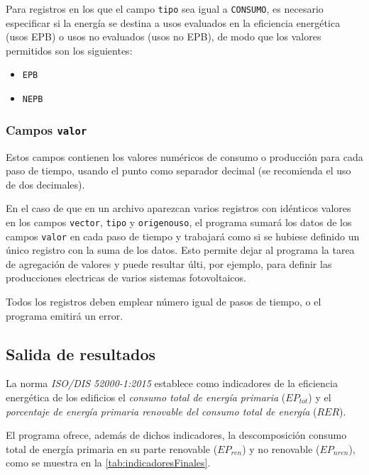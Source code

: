 \documentclass[10pt,notitlepage,oneside,a4paper]{article}
\begin{document}
Para registros en los que el campo \texttt{tipo} sea igual a \texttt{CONSUMO}, es necesario especificar si la energía se destina a usos evaluados en la eficiencia energética (usos EPB) o usos no evaluados (usos no EPB), de modo que los valores permitidos son los siguientes:

\begin{itemize}
\item \texttt{EPB}
\item \texttt{NEPB}
\end{itemize}

\subsubsection{Campos \texttt{valor}}

Estos campos contienen los valores numéricos de consumo o producción para cada paso de tiempo, usando el punto como separador decimal (se recomienda el uso de dos decimales).

En el caso de que en un archivo aparezcan varios registros con idénticos valores en los campos \texttt{vector}, \texttt{tipo} y \texttt{origenouso}, el programa sumará los datos de los campos \texttt{valor} en cada paso de tiempo y trabajará como si se hubiese definido un único registro con la suma de los datos. Esto permite dejar al programa la tarea de agregación de valores y puede resultar últi, por ejemplo, para definir las producciones electricas de varios sistemas fotovoltaicos.

Todos los registros deben emplear número igual de pasos de tiempo, o el programa emitirá un error.

\subsection{Salida de resultados}

La norma \textit{ISO/DIS 52000-1:2015} establece como indicadores de la eficiencia energética de los edificios el \textit{consumo total de energía primaria} (\texttt{$EP_{tot}$}) y el \textit{porcentaje de energía primaria renovable del consumo total de energía} (\texttt{$RER$}).

El programa ofrece, además de dichos indicadores, la descomposición consumo total de energía primaria en su parte renovable (\texttt{$EP_{ren}$}) y no renovable (\texttt{$EP_{nren}$}), como se muestra en la \autoref{tab:indicadoresFinales}.
\end{document}
